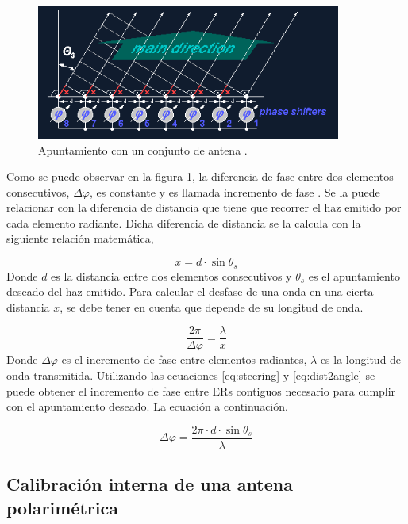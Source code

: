 \begin{figure}[H]
 \centering
 \includegraphics[width=10cm]{gfx/beamSteering.png}
 \caption{Apuntamiento con un conjunto de antena \cite{BeamSteering}.}
 \label{fig:beamSteering}
\end{figure}

Como se puede observar en la figura \ref{fig:beamSteering}, la diferencia de fase entre dos elementos consecutivos,
$\Delta\varphi$, es constante y es llamada incremento de fase \cite{BeamSteering}. Se la puede relacionar con la diferencia
de distancia que tiene que recorrer el haz emitido por cada elemento radiante. Dicha diferencia de distancia se la calcula con
la siguiente relación matemática,


\begin{equation}
	x = d\cdot \sin{\theta_s}
	\label{eq:steering}
\end{equation}
Donde $d$ es la distancia entre dos elementos consecutivos y $\theta_s$ es el apuntamiento deseado del haz emitido. Para calcular
el desfase de una onda en una cierta distancia $x$, se debe tener en cuenta que depende de su longitud de onda.

\begin{equation}
	\dfrac{2\pi}{\Delta\varphi} = \dfrac{\lambda}{x}
	\label{eq:dist2angle}
\end{equation}
Donde $\Delta\varphi$ es el incremento de fase entre elementos radiantes, $\lambda$ es la longitud de onda transmitida.
Utilizando las ecuaciones \ref{eq:steering} y \ref{eq:dist2angle} se puede obtener el incremento de fase entre ERs contiguos 
necesario para cumplir con el apuntamiento deseado. La ecuación a continuación.

\begin{equation}
	\Delta\varphi = \dfrac{2\pi\cdot d\cdot\sin{\theta_s}}{\lambda}
\end{equation}

\subsection{Calibración interna de una antena polarimétrica}

